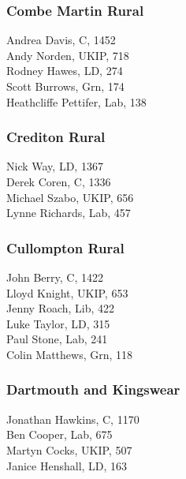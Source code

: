 \documentclass[a4paper,openany,10pt]{book}
\begin{document}
\subsubsection*{Combe Martin Rural}



Andrea Davis, C, 1452\\
Andy Norden, UKIP, 718\\
Rodney Hawes, LD, 274\\
Scott Burrows, Grn, 174\\
Heathcliffe Pettifer, Lab, 138\\


\subsubsection*{Crediton Rural}



Nick Way, LD, 1367\\
Derek Coren, C, 1336\\
Michael Szabo, UKIP, 656\\
Lynne Richards, Lab, 457\\


\subsubsection*{Cullompton Rural}



John Berry, C, 1422\\
Lloyd Knight, UKIP, 653\\
Jenny Roach, Lib, 422\\
Luke Taylor, LD, 315\\
Paul Stone, Lab, 241\\
Colin Matthews, Grn, 118\\


\subsubsection*{Dartmouth and Kingswear}



Jonathan Hawkins, C, 1170\\
Ben Cooper, Lab, 675\\
Martyn Cocks, UKIP, 507\\
Janice Henshall, LD, 163\\
\end{document}
